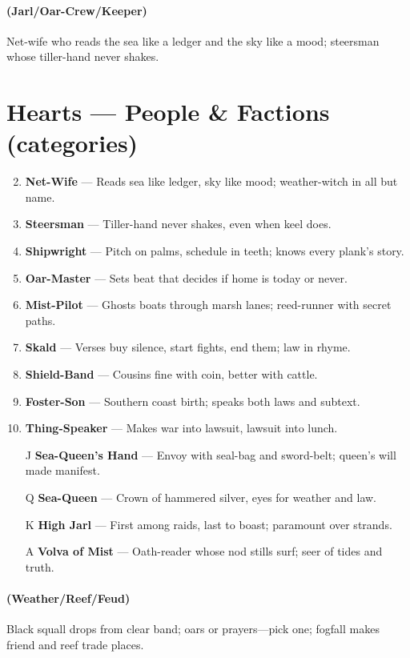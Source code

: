 \paragraph*{(Jarl/Oar-Crew/Keeper)} Net-wife who reads the sea like a ledger and the sky like a mood; steersman whose tiller-hand never shakes.

\section*{Hearts --- People \& Factions (categories)}
\label{sec:linn-people}
\begin{enumerate}
\setcounter{enumi}{1}
\item \textbf{Net-Wife} --- Reads sea like ledger, sky like mood; weather-witch in all but name.
\item \textbf{Steersman} --- Tiller-hand never shakes, even when keel does.
\item \textbf{Shipwright} --- Pitch on palms, schedule in teeth; knows every plank's story.
\item \textbf{Oar-Master} --- Sets beat that decides if home is today or never.
\item \textbf{Mist-Pilot} --- Ghosts boats through marsh lanes; reed-runner with secret paths.
\item \textbf{Skald} --- Verses buy silence, start fights, end them; law in rhyme.
\item \textbf{Shield-Band} --- Cousins fine with coin, better with cattle.
\item \textbf{Foster-Son} --- Southern coast birth; speaks both laws and subtext.
\item \textbf{Thing-Speaker} --- Makes war into lawsuit, lawsuit into lunch.
\item[J] \textbf{Sea-Queen's Hand} --- Envoy with seal-bag and sword-belt; queen's will made manifest.
\item[Q] \textbf{Sea-Queen} --- Crown of hammered silver, eyes for weather and law.
\item[K] \textbf{High Jarl} --- First among raids, last to boast; paramount over strands.
\item[A] \textbf{Volva of Mist} --- Oath-reader whose nod stills surf; seer of tides and truth.
\end{enumerate}

\paragraph*{(Weather/Reef/Feud)} Black squall drops from clear band; oars or prayers---pick one; fogfall makes friend and reef trade places.

